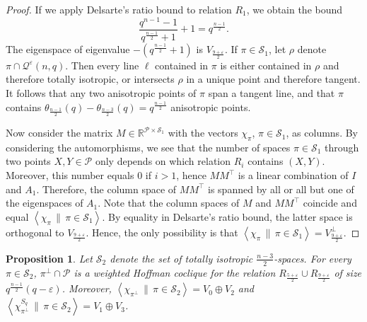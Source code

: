 \documentclass[a4paper]{article}
\newtheorem{prop}[thm]{Proposition}
\theoremstyle{definition}
\newcommand{\eps}{\varepsilon}
\newcommand{\RR}{\mathbb R}
\newcommand{\vspann}[2]{\left \langle #1 \, \| \, #2 \right \rangle}
\newcommand{\pp}{\mathcal P}
\newcommand{\mq}{\mathcal Q}
\newcommand{\ms}{\mathcal S}
\begin{document}
\begin{proof}
 If we apply Delsarte's ratio bound to relation $R_1$, we obtain the bound 
 \[
  \frac{q^{n-1}-1}{q^{\frac{n-1}2}+1} + 1 = q^\frac{n-1}2.
 \]
 The eigenspace of eigenvalue $-(q^{\frac{n-1}2}+1)$ is $V_{\frac{9+\eps}2}$.
 If $\pi \in \ms_1$, let $\rho$ denote $\pi \cap \mq^\eps(n,q)$.
 Then every line $\ell$ contained in $\pi$ is either contained in $\rho$ and therefore totally isotropic, or intersects $\rho$ in a unique point and therefore tangent.
 It follows that any two anisotropic points of $\pi$ span a tangent line, and that $\pi$ contains $\theta_{\frac{n-1}2}(q) - \theta_{\frac{n-3}2}(q) = q^\frac{n-1}2$ anisotropic points.

 Now consider the matrix $M \in \RR^{\pp \times \ms_1}$ with the vectors $\chi_\pi$, $\pi \in \ms_1$, as columns.
 By considering the automorphisms, we see that the number of spaces $\pi \in \ms_1$ through two points $X,Y \in \pp$ only depends on which relation $R_i$ contains $(X,Y)$.
 Moreover, this number equals 0 if $i > 1$, hence $M M^\top$ is a linear combination of $I$ and $A_1$.
 Therefore, the column space of $M M^\top$ is spanned by all or all but one of the eigenspaces of $A_1$.
 Note that the column spaces of $M$ and $M M^\top$ coincide and equal $\vspann{\chi_\pi}{\pi \in \ms_1}$.
 By equality in Delsarte's ratio bound, the latter space is orthogonal to $V_{\frac{9+\eps}2}$.
 Hence, the only possibility is that $\vspann{\chi_\pi}{\pi \in \ms_1} = V_{\frac{9+\eps}2}^\perp$.
\end{proof}

\begin{prop}
 \label{Prop:RDisjointHoffman}
 Let $\ms_2$ denote the set of totally isotropic $\frac{n-3}2$-spaces.
 For every $\pi \in \ms_2$, $\pi^\perp \cap \pp$ is a weighted Hoffman coclique for the relation $R_\frac{5+\eps}2 \cup R_\frac{9+\eps}2$ of size $q^\frac{n-1}2(q-\eps)$.
 Moreover, $\vspann{\chi_{\pi^\perp}}{\pi \in \ms_2} = V_0 \oplus V_2$ and $\vspann{\chi_{\pi^\perp}^{S_q}}{\pi \in \ms_2} = V_1 \oplus V_3$.
\end{prop}
\end{document}
